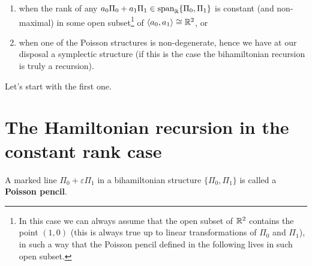 \documentclass[main.tex]{subfiles}
\begin{document}
\begin{enumerate}
	\item when the rank of any $a_0\Pi_0 + a_1\Pi_1 \in \operatorname{span}_{\mathbb{R}} \{\Pi_0, \Pi_1\}$ is constant (and non-maximal) in some open subset\footnote{In this case we can always assume that the open subset of $\mathbb{R}^2$ contains the point $(1, 0)$ (this is always true up to linear transformations of $\Pi_0$ and $\Pi_1$), in such a way that the Poisson pencil defined in the following lives in such open subset.} of $\langle a_0, a_1\rangle \overset{}{\cong} \mathbb{R}^2$, or
	\item when one of the Poisson structures is non-degenerate, hence we have at our disposal a symplectic structure (if this is the case the bihamiltonian recursion is truly a recursion).
\end{enumerate}

Let's start with the first one.

\section{The Hamiltonian recursion in the constant rank case}
\begin{definition}
	A marked line $\Pi_0 + \varepsilon \Pi_1$ in a bihamiltonian structure $\{\Pi_0, \Pi_1\}$ is called a \textbf{Poisson pencil}.
\end{definition}
\end{document}
